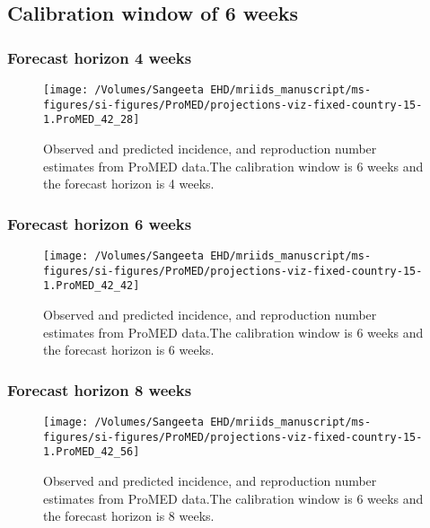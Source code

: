 \documentclass[9pt,twoside,lineno]{pnas-new}
\begin{document}
\hypertarget{calibration-window-of-6-weeks}{%
  \subsection{Calibration window of 6 weeks}\label{calibration-window-of-6-weeks}}

\hypertarget{forecast-horizon-4-weeks-1}{%
  \subsubsection{Forecast horizon 4 weeks}\label{forecast-horizon-4-weeks-1}}

\begin{figure}

  {
    \centering \texttt{[image: /Volumes/Sangeeta EHD/mriids\_manuscript/ms-figures/si-figures/ProMED/projections-viz-fixed-country-15-1.ProMED\_42\_28]} 

  }

  \caption{Observed and predicted incidence, and reproduction number
    estimates from ProMED data.The calibration window is 6 weeks and
    the forecast horizon is 4 weeks.}
  \label{fig:pm64}
\end{figure}

\hypertarget{forecast-horizon-6-weeks-2}{%
  \subsubsection{Forecast horizon 6 weeks}\label{forecast-horizon-6-weeks-2}}

\begin{figure}

  {
    \centering \texttt{[image: /Volumes/Sangeeta EHD/mriids\_manuscript/ms-figures/si-figures/ProMED/projections-viz-fixed-country-15-1.ProMED\_42\_42]} 
  }
  \caption{Observed and predicted incidence, and
    reproduction number estimates from ProMED data.The calibration
    window is 6 weeks and the forecast horizon is 6 weeks.}
  \label{fig:pm66}
\end{figure}

\hypertarget{forecast-horizon-8-weeks-2}{%
  \subsubsection{Forecast horizon 8 weeks}\label{forecast-horizon-8-weeks-2}}

\begin{figure}
  {
    \centering \texttt{[image: /Volumes/Sangeeta EHD/mriids\_manuscript/ms-figures/si-figures/ProMED/projections-viz-fixed-country-15-1.ProMED\_42\_56]} 
  }
  \caption{Observed and predicted incidence, and reproduction number
    estimates from ProMED data.The calibration window is 6 weeks and
    the forecast horizon is 8 weeks.}
  \label{fig:pm68}
\end{figure}
\end{document}
